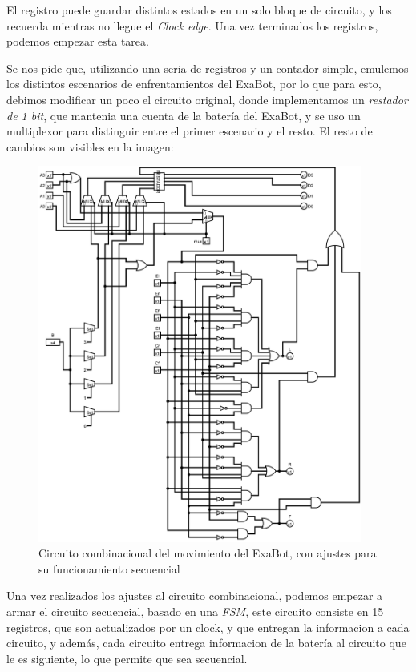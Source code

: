 \documentclass[a4paper]{article}
\begin{document}
El registro puede guardar distintos estados en un solo bloque de circuito, y los recuerda mientras no llegue el \textit{Clock edge}.
Una vez terminados los registros, podemos empezar esta tarea.

Se nos pide que, utilizando una seria de registros y un contador simple, emulemos los distintos escenarios de enfrentamientos del ExaBot, por lo que para esto, debimos modificar un poco el circuito original, donde implementamos un \textit{restador de 1 bit}, que mantenia una cuenta de la batería del ExaBot, y se uso un multiplexor para distinguir entre el primer escenario y el resto. El resto de cambios son visibles en la imagen:
\newpage

\begin{figure}[!htbp]
    \centering
    \includegraphics[width=0.95\textwidth]{Circuito combi.jpg}
    \caption{Circuito combinacional del movimiento del ExaBot, con ajustes para su funcionamiento secuencial}
    \label{fig:CircCombiNuevo}
\end{figure}

Una vez realizados los ajustes al circuito combinacional, podemos empezar a armar el circuito secuencial, basado en una \textit{FSM}, este circuito consiste en 15 registros, que son actualizados por un clock, y que entregan la informacion a cada circuito, y además, cada circuito entrega informacion de la batería al circuito que le es siguiente, lo que permite que sea secuencial.
\end{document}
